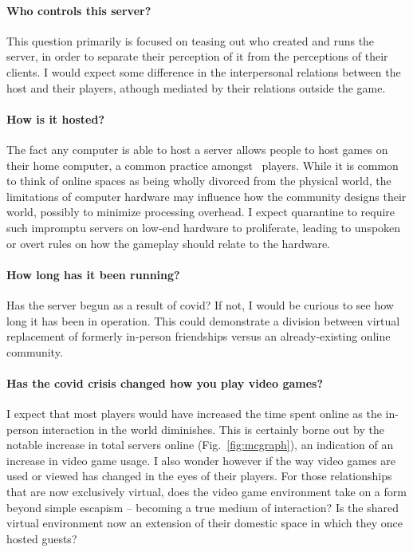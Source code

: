 \documentclass[2020/08/28 v2]{../../../coursework}
\newcommand{\mc}{\citetitle{Minecraft}}
\begin{document}
\paragraph{Who controls this server?}

This question primarily is focused on teasing out who created and runs the server,
in order to separate their perception of it from the perceptions of their clients.
I would expect some difference in the interpersonal relations between the host
and their players, athough mediated by their relations outside the game.

\paragraph{How is it hosted?}

The fact any computer is able to host a server allows people to host games on their
home computer, a common practice amongst \mc\ players. While it is common to think
of online spaces as being wholly divorced from the physical world, the limitations
of computer hardware may influence how the community designs their world, possibly
to minimize processing overhead. I expect quarantine to require such impromptu servers
on low-end hardware to proliferate, leading to unspoken or overt rules on how the
gameplay should relate to the hardware.

\paragraph{How long has it been running?}

Has the server begun as a result of \ac{covid}? If not, I would be curious to see
how long it has been in operation. This could demonstrate a division between
virtual replacement of formerly in-person friendships versus an already-existing
online community.

\paragraph{Has the \ac{covid} crisis changed how you play video games?}

I expect that most players would have increased the time spent online as
the in-person interaction in the world diminishes. This is certainly borne out
by the notable increase in total servers online (Fig.~\ref{fig:mcgraph}), an
indication of an increase in video game usage. I also wonder however if the way
video games are used or viewed has changed in the eyes of their players. For
those relationships that are now exclusively virtual, does the video game environment
take on a form beyond simple escapism -- becoming a true medium of interaction?
Is the shared virtual environment now an extension of their domestic space
in which they once hosted guests?
\end{document}

